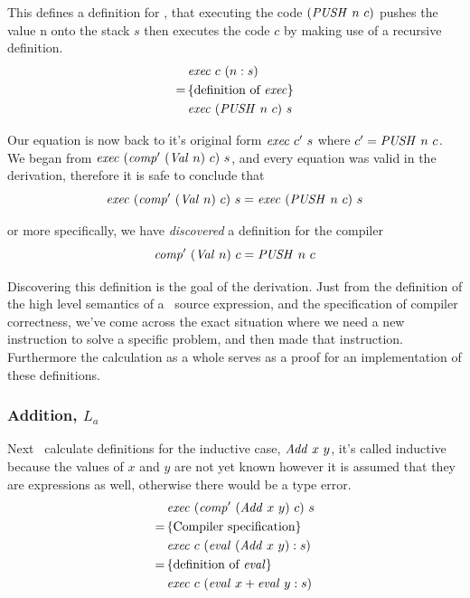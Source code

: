 \documentclass {article}
\begin{document}
This defines a definition for \exec, 
that executing the code \( (\mathit{PUSH\ } n\ c) \) 
pushes the value n onto the stack $s$
then executes the code $c$ by making use of 
a recursive definition.
\begin{align*}
&\mathit{exec\ } c\ (n:s) \\
=\, & \{\mbox{definition of \textit{exec}}\} \\
&\mathit{exec\ }  (\mathit{PUSH\ } n\ c)\ s
\end{align*}

Our equation is now back to it's original form $\mathit{exec\ } c'\ s$
where $c' = \mathit{PUSH\ } n\ c$. We began from 
\(\mathit{exec\ } (\mathit{comp'\ } (\mathit{Val\ } n)\ c)\ s \),
and every equation was valid in the derivation,
therefore it is safe to conclude that 
\begin{equation*}
\mathit{exec\ } (\mathit{comp'\ } (\mathit{Val\ }  n)\ c)\ s = \mathit{exec\ }  (\mathit{PUSH\ } n\ c)\ s 
\end{equation*}

\noindent or more specifically, we have \emph{discovered} 
a definition for the compiler
\begin{equation}
\mathit{comp'\ }  (\mathit{Val\ } n)\ c =  \mathit{PUSH\ } n\ c \label{compval}
\end{equation}

Discovering this definition is the 
goal of the derivation.
Just from the definition of the high level semantics 
of a \val\ source expression, and the specification 
of compiler correctness, we've come across the
exact situation where we need a new instruction
to solve a specific problem,
and then made that instruction. 
Furthermore the calculation as a whole
serves as a proof for an implementation
of these definitions.

\subsubsection{Addition, $L_a$} \label{addsec}

Next \BH\ calculate definitions for the inductive case, 
$\mathit{Add\ } x\ y$,
it's called inductive because  
the values of $x$ and $y$ are not yet known
however it is assumed
that they are expressions as well,
otherwise there would be a type error.
\begin{align*}
&\mathit{exec\ } (\mathit{comp'\ }  (\mathit{Add\ } x\ y)\ c)\ s \\
=\, & \{ \mbox{Compiler specification} \} \\
&\mathit{exec\ } c\ (\mathit{eval\ } (\mathit{Add\ } x\ y) : s) \\
=\, & \{ \mbox{definition of \textit{eval}} \} \\
&\mathit{exec\ } c\ (\mathit{eval\ } x + \mathit{eval\ } y :s)
\end{align*}
\end{document}
